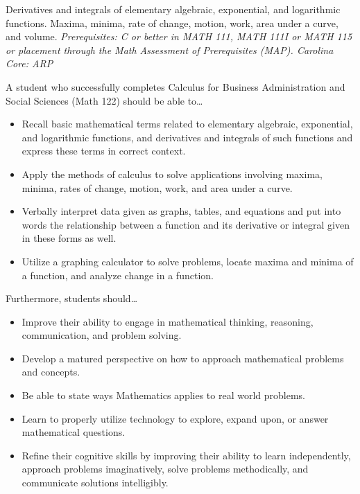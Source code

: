 \documentclass[11pt,letterpaper]{article}
\begin{document}

Derivatives and integrals of elementary algebraic, exponential, and logarithmic functions. Maxima, minima, rate of change, motion, work, area under a curve, and volume. {\itshape Prerequisites: C or better in MATH 111, MATH 111I or MATH 115 or placement through the Math Assessment of Prerequisites (MAP). Carolina Core: ARP}
\sectionbreak




A student who successfully completes Calculus for Business Administration and Social Sciences (Math 122) should be able to\dots
	\begin{itemize} \itemsep=0.3ex
	\item Recall basic mathematical terms related to elementary algebraic, exponential, and logarithmic functions, and derivatives and integrals of such functions and express these terms in correct context. 
	\item Apply the methods of calculus to solve applications involving maxima, minima, rates of change, motion, work, and area under a curve. 
	\item Verbally interpret data given as graphs, tables, and equations and put into words the relationship between a function and its derivative or integral given in these forms as well. 
	\item Utilize a graphing calculator to solve problems, locate maxima and minima of a function, and analyze change in a function. 
	\end{itemize}
Furthermore, students should\dots
	\begin{itemize} \itemsep=0.3ex
	\item  Improve their ability to engage in mathematical thinking, reasoning, communication, and problem solving.
	\item Develop a matured perspective on how to approach mathematical problems and concepts.
	\item Be able to state ways Mathematics applies to real world problems.
	\item Learn to properly utilize technology to explore, expand upon, or answer mathematical questions.
	\item Refine their cognitive skills by improving their ability to learn independently, approach problems imaginatively, solve problems methodically, and communicate solutions intelligibly.
	\end{itemize}
\par\vspace{0.4cm}
\end{document}
